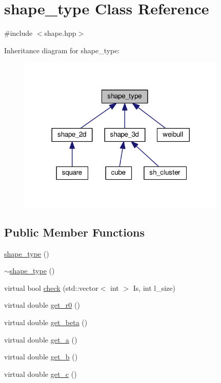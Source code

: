 \hypertarget{classshape__type}{}\section{shape\+\_\+type Class Reference}
\label{classshape__type}


{\ttfamily \#include $<$shape.\+hpp$>$}



Inheritance diagram for shape\+\_\+type\+:
\nopagebreak
\begin{figure}[H]
\begin{center}
\leavevmode
\includegraphics[width=281pt]{d2/da8/classshape__type__inherit__graph}
\end{center}
\end{figure}
\subsection*{Public Member Functions}
\begin{DoxyCompactItemize}
\item 
\hyperlink{classshape__type_a166412643048108f9d26fff1aa4078c0}{shape\+\_\+type} ()
\item 
\hyperlink{classshape__type_a409407285e724c1956488a9c807ac2ca}{$\sim$shape\+\_\+type} ()
\item 
virtual bool \hyperlink{classshape__type_a69a17f14890bf130c990d2d54ddf6f86}{check} (std\+::vector$<$ int $>$ Is, int l\+\_\+size)
\item 
virtual double \hyperlink{classshape__type_af0fc24250d5cb5cbc4881caffee31371}{get\+\_\+r0} ()
\item 
virtual double \hyperlink{classshape__type_ad04d2331bc8bcd8504719fec8e852f32}{get\+\_\+beta} ()
\item 
virtual double \hyperlink{classshape__type_a68e467cf7ec75b436f0d0054d824766d}{get\+\_\+a} ()
\item 
virtual double \hyperlink{classshape__type_a4db290d08ad12bf153d6f8ffdc4d44af}{get\+\_\+b} ()
\item 
virtual double \hyperlink{classshape__type_a5ab8305b100bc3bba1ae4c14bd8257da}{get\+\_\+c} ()
\end{DoxyCompactItemize}



